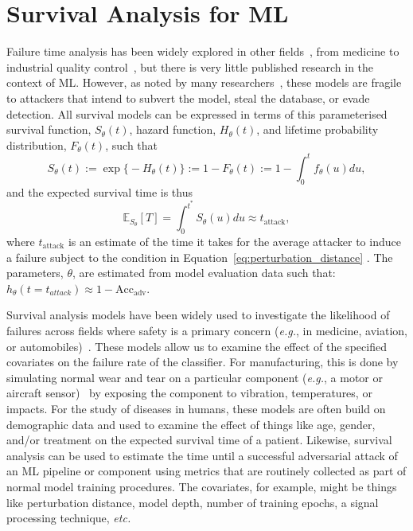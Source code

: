 \section{Survival Analysis for ML} 
\label{afr_models}

Failure time analysis has been widely explored in other fields~\cite{aft_models}, from medicine to industrial quality control~\cite{ai_medical_imaging,ai_industry,ai_aviation,ai_luggage,ai_security,ai_prison}, but there is very little published research in the context of ML. However, as noted by many researchers~\cite{madry2017towards, carlini_towards_2017, croce_reliable_2020, meyers}, these models are fragile to attackers that intend to subvert the model, steal the database, or evade detection.   All survival models can be expressed in terms of this parameterised survival function, $S_\theta(t)$, hazard function, $H_\theta(t)$, and lifetime probability distribution, $F_{\theta}(t)$, such that
$$
	S_{\theta}(t) := \exp\big\{-H_{\theta}(t)\big\} := 1 - F_{\theta}(t) := 1 - \int_0^t f_\theta(u) du,
$$
and the expected survival time is thus
$$
	\mathbb{E}_{S_\theta}[T] =  \int_{0}^{t^*} S_{\theta}(u) du \approx t_{\mathrm{attack}}, 
$$
where $t_{\mathrm{attack}}$ is an estimate of the time it takes for the average attacker to induce a failure subject to the condition in Equation~\ref{eq:perturbation_distance} . The parameters, $\theta$, are estimated from model evaluation data such that: $h_{\theta}(t=t_{attack}) \approx 1 - \mathrm{Acc}_{\mathrm{adv}}$.

Survival analysis models have been widely used to investigate the likelihood of failures across fields where safety is a primary concern (\textit{e.g.}, in medicine, aviation, or automobiles)~\cite{liu2013development,lawless1995methods}. These models allow us to examine the effect of the specified covariates on the failure rate of the classifier. For manufacturing, this is done by simulating normal wear and tear on a particular component (\textit{e.g.}, a motor or aircraft sensor)~\cite{liu2013development} by exposing the component to vibration, temperatures, or impacts. For the study of diseases in humans, these models are often build on demographic data and used to examine the effect of things like age, gender, and/or treatment on the expected survival time of a patient. 
Likewise, survival analysis can be used to estimate the time until a successful adversarial attack of an ML pipeline or component using metrics that are routinely collected as part of normal model training procedures. The covariates, for example, might be things like perturbation distance, model depth, number of training epochs, a signal processing technique, \textit{etc.}


